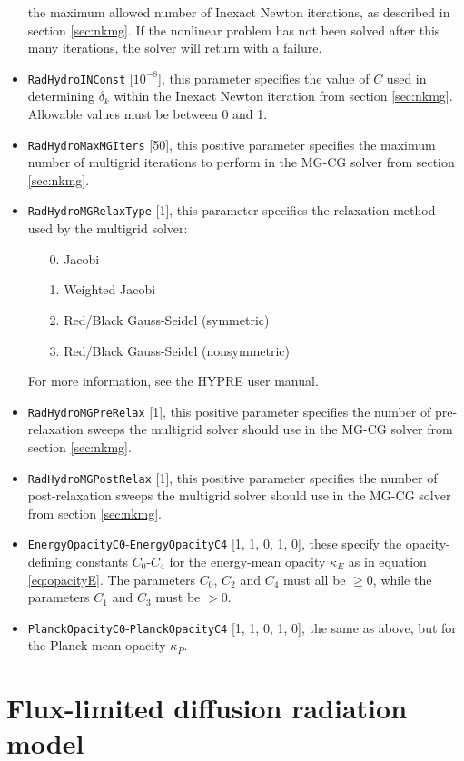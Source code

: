 \documentclass[letterpaper,10pt]{article}
\renewcommand{\(}{\left(}
\renewcommand{\)}{\right)}
\begin{document}
\begin{itemize}
  the maximum allowed number of Inexact Newton iterations, as
  described in section \ref{sec:nkmg}.  If the nonlinear problem has
  not been solved after this many iterations, the solver will return
  with a failure. 
\item {\tt RadHydroINConst} [$10^{-8}$], this parameter specifies
  the value of $C$ used in determining $\delta_k$ within the Inexact
  Newton iteration from section \ref{sec:nkmg}.  Allowable values must
  be between 0 and 1.
\item {\tt RadHydroMaxMGIters} [50], this positive parameter
  specifies the maximum number of multigrid iterations to perform in
  the MG-CG solver from section \ref{sec:nkmg}.
\item {\tt RadHydroMGRelaxType} [1], this parameter specifies the
  relaxation method used by the multigrid solver:
  \begin{itemize}
  \item[0.] Jacobi
  \item[1.] Weighted Jacobi
  \item[2.] Red/Black Gauss-Seidel (symmetric)
  \item[3.] Red/Black Gauss-Seidel (nonsymmetric)
  \end{itemize}
  For more information, see the HYPRE user manual.
\item {\tt RadHydroMGPreRelax} [1], this positive parameter
  specifies the number of pre-relaxation sweeps the multigrid solver
  should use in the MG-CG solver from section \ref{sec:nkmg}.
\item {\tt RadHydroMGPostRelax} [1], this positive parameter
  specifies the number of post-relaxation sweeps the multigrid solver
  should use in the MG-CG solver from section \ref{sec:nkmg}.
\item {\tt EnergyOpacityC0}-{\tt EnergyOpacityC4} [1, 1, 0, 1, 0],
  these specify the opacity-defining constants $C_0$-$C_4$ for the
  energy-mean opacity $\kappa_E$ as in equation \eqref{eq:opacityE}.
  The parameters $C_0$, $C_2$ and $C_4$ must all be $\ge 0$, while the
  parameters $C_1$ and $C_3$ must be $> 0$.
\item {\tt PlanckOpacityC0}-{\tt PlanckOpacityC4} [1, 1, 0, 1, 0], the
  same as above, but for the Planck-mean opacity $\kappa_P$.
\end{itemize}





\section{Flux-limited diffusion radiation model}
\label{sec:rad_model}
\end{document}
